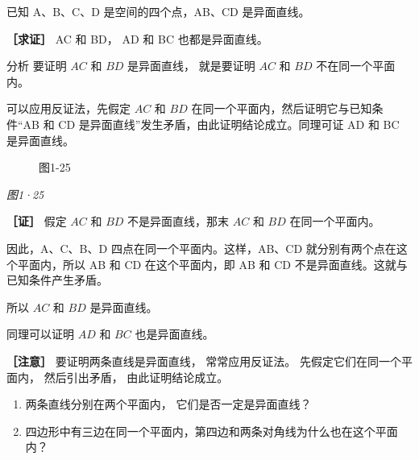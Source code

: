 已知 A、B、C、D 是空间的四个点，AB、CD 是异面直线。

\textbf{［求证］} AC 和 BD， AD 和 BC 也都是异面直线。

分析 要证明 \(AC\) 和 \(BD\) 是异面直线， 就是要证明 \(AC\) 和 \(BD\)
不在同一个平面内。

可以应用反证法，先假定 \(AC\) 和 \(BD\)
在同一个平面内，然后证明它与已知条件``AB 和 CD
是异面直线''发生矛盾，由此证明结论成立。同理可证 AD 和 BC 是异面直线。

\begin{figure}
\centering
{}
\caption{图1-25}
\end{figure}

\emph{图1·25}

\textbf{［证］} 假定 \(AC\) 和 \(BD\) 不是异面直线，那末 \(AC\) 和
\(BD\) 在同一个平面内。

因此，A、C、B、D 四点在同一个平面内。这样，AB、CD
就分别有两个点在这个平面内，所以 AB 和 CD 在这个平面内，即 AB 和 CD
不是异面直线。这就与已知条件产生矛盾。

所以 \(AC\) 和 \(BD\) 是异面直线。

同理可以证明 \(AD\) 和 \(BC\) 也是异面直线。

\textbf{［注意］} 要证明两条直线是异面直线， 常常应用反证法。
先假定它们在同一个平面内， 然后引出矛盾， 由此证明结论成立。

\begin{enumerate}
\item
  两条直线分别在两个平面内， 它们是否一定是异面直线？
\item
  四边形中有三边在同一个平面内，第四边和两条对角线为什么也在这个平面内？
\end{enumerate}

